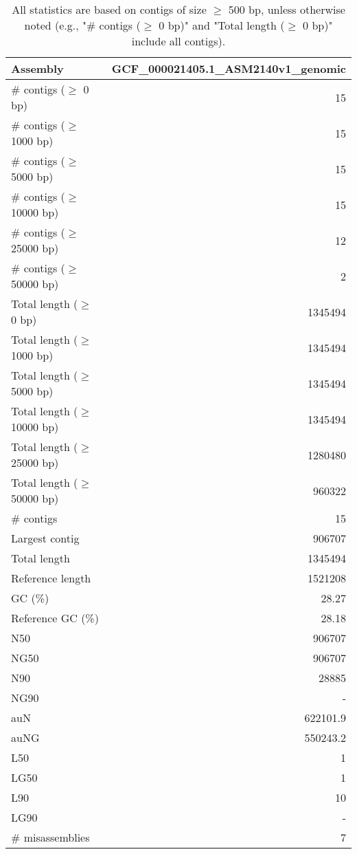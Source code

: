 \documentclass[12pt,a4paper]{article}
\begin{document}
\begin{table}[ht]
\begin{center}
\caption{All statistics are based on contigs of size $\geq$ 500 bp, unless otherwise noted (e.g., "\# contigs ($\geq$ 0 bp)" and "Total length ($\geq$ 0 bp)" include all contigs).}
\begin{tabular}{|l*{1}{|r}|}
\hline
Assembly & GCF\_000021405.1\_ASM2140v1\_genomic \\ \hline
\# contigs ($\geq$ 0 bp) & 15 \\ \hline
\# contigs ($\geq$ 1000 bp) & 15 \\ \hline
\# contigs ($\geq$ 5000 bp) & 15 \\ \hline
\# contigs ($\geq$ 10000 bp) & 15 \\ \hline
\# contigs ($\geq$ 25000 bp) & 12 \\ \hline
\# contigs ($\geq$ 50000 bp) & 2 \\ \hline
Total length ($\geq$ 0 bp) & 1345494 \\ \hline
Total length ($\geq$ 1000 bp) & 1345494 \\ \hline
Total length ($\geq$ 5000 bp) & 1345494 \\ \hline
Total length ($\geq$ 10000 bp) & 1345494 \\ \hline
Total length ($\geq$ 25000 bp) & 1280480 \\ \hline
Total length ($\geq$ 50000 bp) & 960322 \\ \hline
\# contigs & 15 \\ \hline
Largest contig & 906707 \\ \hline
Total length & 1345494 \\ \hline
Reference length & 1521208 \\ \hline
GC (\%) & 28.27 \\ \hline
Reference GC (\%) & 28.18 \\ \hline
N50 & 906707 \\ \hline
NG50 & 906707 \\ \hline
N90 & 28885 \\ \hline
NG90 & - \\ \hline
auN & 622101.9 \\ \hline
auNG & 550243.2 \\ \hline
L50 & 1 \\ \hline
LG50 & 1 \\ \hline
L90 & 10 \\ \hline
LG90 & - \\ \hline
\# misassemblies & 7 \\ \hline

\end{tabular}
\end{center}
\end{table}
\end{document}

